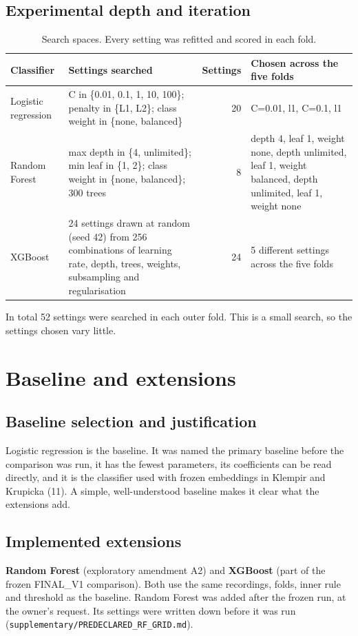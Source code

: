 \documentclass[11pt,a4paper]{article}
\begin{document}
\subsection{Experimental depth and iteration}\label{sec:depth}
\begin{table}[H]\centering\footnotesize\renewcommand{\arraystretch}{1.15}
\caption{Search spaces. Every setting was refitted and scored in each fold.}
\begin{tabular}{lp{6.2cm}rp{4.6cm}}
\toprule
\textbf{Classifier} & \textbf{Settings searched} & \textbf{Settings} & \textbf{Chosen across the five folds}\\
\midrule
Logistic regression & C in \{0.01, 0.1, 1, 10, 100\}; penalty in \{L1, L2\}; class weight in \{none, balanced\} & 20 & C=0.01, l1, C=0.1, l1\\
Random Forest & max depth in \{4, unlimited\}; min leaf in \{1, 2\}; class weight in \{none, balanced\}; 300 trees & 8 & depth 4, leaf 1, weight none, depth unlimited, leaf 1, weight balanced, depth unlimited, leaf 1, weight none\\
XGBoost & 24 settings drawn at random (seed 42) from 256 combinations of learning rate, depth, trees, weights, subsampling and regularisation & 24 & 5 different settings across the five folds\\
\bottomrule
\end{tabular}\end{table}
In total 52 settings were searched in each outer fold. This is a small search, so the settings chosen vary little.

\section{Baseline and extensions}\label{sec:baseline}
\subsection{Baseline selection and justification}\label{sec:baselineselect}
Logistic regression is the baseline. It was named the primary baseline before the comparison was run, it has the fewest parameters, its coefficients can be read directly, and it is the classifier used with frozen embeddings in Klempir and Krupicka (11). A simple, well-understood baseline makes it clear what the extensions add.

\subsection{Implemented extensions}\label{sec:extensions}
\textbf{Random Forest} (exploratory amendment A2) and \textbf{XGBoost} (part of the frozen FINAL\_V1 comparison). Both use the same recordings, folds, inner rule and threshold as the baseline. Random Forest was added after the frozen run, at the owner's request. Its settings were written down before it was run (\texttt{supplementary/PREDECLARED\_\allowbreak{}RF\_\allowbreak{}GRID.md}).
\end{document}
